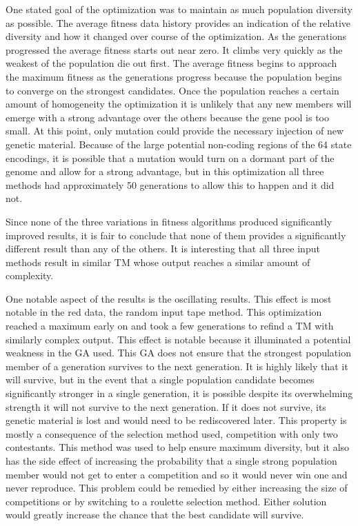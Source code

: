 One stated goal of the optimization was to maintain as much population diversity as possible. The average fitness data history provides an indication of the relative diversity and how it changed over course of the optimization. As the generations progressed the average fitness starts out near zero. It climbs very quickly as the weakest of the population die out first. The average fitness begins to approach the maximum fitness as the generations progress because the population begins to converge on the strongest candidates. Once the population reaches a certain amount of homogeneity the optimization it is unlikely that any new members will emerge with a strong advantage over the others because the gene pool is too small. At this point, only mutation could provide the necessary injection of new genetic material. Because of the large potential non-coding regions of the 64 state encodings, it is possible that a mutation would turn on a dormant part of the genome and allow for a strong advantage, but in this optimization all three methods had approximately 50 generations to allow this to happen and it did not. 

Since none of the three variations in fitness algorithms produced significantly improved results, it is fair to conclude that none of them provides a significantly different result than any of the others. It is interesting that all three input methods result in similar TM whose output reaches a similar amount of complexity. 

One notable aspect of the results is the oscillating results. This effect is most notable in the red data, the random input tape method. This optimization reached a maximum early on and took a few generations to refind a TM with similarly complex output. This effect is notable because it illuminated a potential weakness in the GA used. This GA does not ensure that the strongest population member of a generation survives to the next generation. It is highly likely that it will survive, but in the event that a single population candidate becomes significantly stronger in a single generation, it is possible despite its overwhelming strength it will not survive to the next generation. If it does not survive, its genetic material is lost and would need to be rediscovered later. This property is mostly a consequence of the selection method used, competition with only two contestants. This method was used to help ensure maximum diversity, but it also has the side effect of increasing the probability that a single strong population member would not get to enter a competition and so it would never win one and never reproduce. This problem could be remedied by either increasing the size of competitions or by switching to a roulette selection method. Either solution would greatly increase the chance that the best candidate will survive. 

